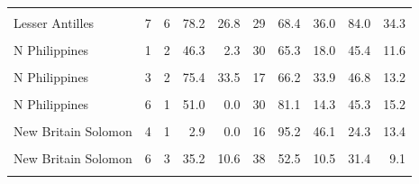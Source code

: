 \begin{ThreePartTable}
\begin{longtable}[t]{lrrrrrrrrr}
\cellcolor{gray!6}{Lesser Antilles} & \cellcolor{gray!6}{6} & \cellcolor{gray!6}{24} & \cellcolor{gray!6}{74.4} & \cellcolor{gray!6}{89.3} & \cellcolor{gray!6}{17} & \cellcolor{gray!6}{68.6} & \cellcolor{gray!6}{83.1} & \cellcolor{gray!6}{81.1} & \cellcolor{gray!6}{103.9}\\
Lesser Antilles & 7 & 6 & 78.2 & 26.8 & 29 & 68.4 & 36.0 & 84.0 & 34.3\\
\cellcolor{gray!6}{Lesser Antilles} & \cellcolor{gray!6}{8} & \cellcolor{gray!6}{14} & \cellcolor{gray!6}{54.5} & \cellcolor{gray!6}{32.0} & \cellcolor{gray!6}{46} & \cellcolor{gray!6}{64.9} & \cellcolor{gray!6}{20.3} & \cellcolor{gray!6}{59.5} & \cellcolor{gray!6}{21.7}\\
N Philippines & 1 & 2 & 46.3 & 2.3 & 30 & 65.3 & 18.0 & 45.4 & 11.6\\
\cellcolor{gray!6}{N Philippines} & \cellcolor{gray!6}{2} & \cellcolor{gray!6}{3} & \cellcolor{gray!6}{44.0} & \cellcolor{gray!6}{3.3} & \cellcolor{gray!6}{20} & \cellcolor{gray!6}{71.6} & \cellcolor{gray!6}{26.2} & \cellcolor{gray!6}{45.9} & \cellcolor{gray!6}{11.7}\\
N Philippines & 3 & 2 & 75.4 & 33.5 & 17 & 66.2 & 33.9 & 46.8 & 13.2\\
\cellcolor{gray!6}{N Philippines} & \cellcolor{gray!6}{4} & \cellcolor{gray!6}{5} & \cellcolor{gray!6}{23.0} & \cellcolor{gray!6}{7.0} & \cellcolor{gray!6}{33} & \cellcolor{gray!6}{75.7} & \cellcolor{gray!6}{34.2} & \cellcolor{gray!6}{44.5} & \cellcolor{gray!6}{14.1}\\
N Philippines & 6 & 1 & 51.0 & 0.0 & 30 & 81.1 & 14.3 & 45.3 & 15.2\\
\cellcolor{gray!6}{New Britain Solomon} & \cellcolor{gray!6}{3} & \cellcolor{gray!6}{1} & \cellcolor{gray!6}{37.7} & \cellcolor{gray!6}{0.0} & \cellcolor{gray!6}{26} & \cellcolor{gray!6}{83.2} & \cellcolor{gray!6}{24.9} & \cellcolor{gray!6}{38.9} & \cellcolor{gray!6}{13.3}\\
New Britain Solomon & 4 & 1 & 2.9 & 0.0 & 16 & 95.2 & 46.1 & 24.3 & 13.4\\
\cellcolor{gray!6}{New Britain Solomon} & \cellcolor{gray!6}{5} & \cellcolor{gray!6}{3} & \cellcolor{gray!6}{36.8} & \cellcolor{gray!6}{12.1} & \cellcolor{gray!6}{64} & \cellcolor{gray!6}{57.9} & \cellcolor{gray!6}{29.5} & \cellcolor{gray!6}{43.1} & \cellcolor{gray!6}{9.6}\\
New Britain Solomon & 6 & 3 & 35.2 & 10.6 & 38 & 52.5 & 10.5 & 31.4 & 9.1\\
\cellcolor{gray!6}{New Britain Solomon} & \cellcolor{gray!6}{8} & \cellcolor{gray!6}{1} & \cellcolor{gray!6}{58.2} & \cellcolor{gray!6}{0.0} & \cellcolor{gray!6}{19} & \cellcolor{gray!6}{56.6} & \cellcolor{gray!6}{27.8} & \cellcolor{gray!6}{45.7} & \cellcolor{gray!6}{5.4}\\

\end{longtable}
\end{ThreePartTable}
